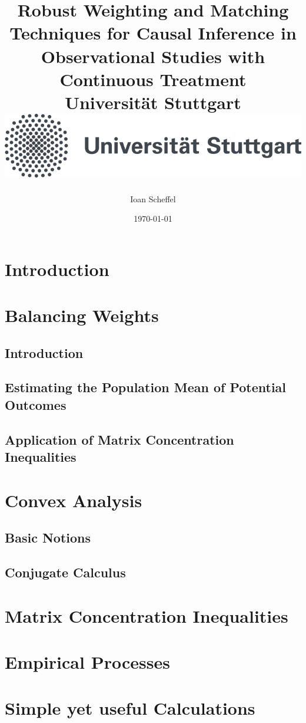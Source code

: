 \documentclass[12pt]{scrreport}
\title{
  {
    Robust Weighting and Matching Techniques for Causal Inference in Observational Studies with Continuous Treatment
  }
  \\
  {\large Universität Stuttgart}
  \\
  {\includegraphics{unistuttgart_logo_deutsch.jpg}}
}
\author{Ioan Scheffel}
\date{\today}
\begin{document}
\maketitle

\tableofcontents 

\chapter{Introduction}


\chapter{Balancing Weights}
  \section{Introduction}
  
  \section{Estimating the Population Mean of Potential Outcomes}
  \section{Application of Matrix Concentration Inequalities}
  
\chapter{Convex Analysis}
  \section{Basic Notions}
  
  \section{Conjugate Calculus}
  
%

\chapter{Matrix Concentration Inequalities}


\chapter{Empirical Processes}


\chapter{Simple yet useful Calculations} 



\printnomenclature

{}

\end{document}
